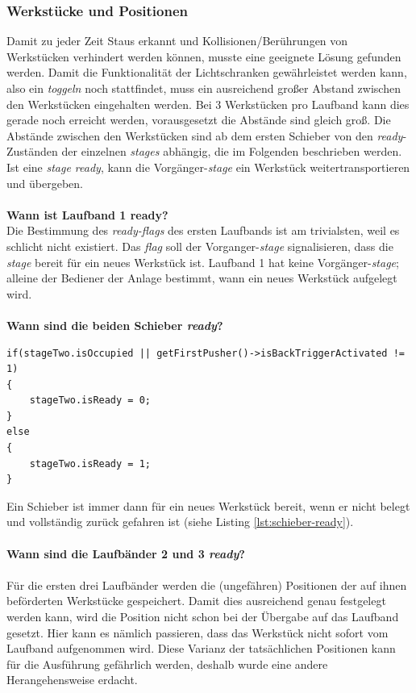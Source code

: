 \documentclass[fontsize=11pt,a4paper,final]{scrartcl}[2003/01/01]
\begin{document}
\subsubsection{Werkstücke und Positionen}
Damit zu jeder Zeit Staus erkannt und Kollisionen/Berührungen von Werkstücken verhindert werden können, musste eine geeignete Lösung gefunden werden. Damit die Funktionalität der Lichtschranken gewährleistet werden kann, also ein \textit{toggeln} noch stattfindet, muss ein ausreichend großer Abstand zwischen den Werkstücken eingehalten werden. Bei 3 Werkstücken pro Laufband kann dies gerade noch erreicht werden, vorausgesetzt die Abstände sind gleich groß. Die Abstände zwischen den Werkstücken sind ab dem ersten Schieber von den \textit{ready}-Zuständen der einzelnen \textit{stages} abhängig, die im Folgenden beschrieben werden. Ist eine \textit{stage ready}, kann die Vorgänger-\textit{stage} ein Werkstück weitertransportieren und übergeben. \\ \\
\textbf{Wann ist Laufband 1 ready?} \\
Die Bestimmung des \textit{ready-flags} des ersten Laufbands ist am trivialsten, weil es schlicht nicht existiert. Das \textit{flag} soll der Vorganger-\textit{stage} signalisieren, dass die \textit{stage} bereit für ein neues Werkstück ist. Laufband 1 hat keine Vorgänger-\textit{stage}; alleine der Bediener der Anlage bestimmt, wann ein neues Werkstück aufgelegt wird. \\ \\
\textbf{Wann sind die beiden Schieber \textit{ready}?}
\begin{lstlisting}[caption={Beispiel: \textit{ready-flag} des ersten Schiebers},label={lst:schieber-ready}]
if(stageTwo.isOccupied || getFirstPusher()->isBackTriggerActivated != 1)
{
   	stageTwo.isReady = 0;
}
else
{
   	stageTwo.isReady = 1;
}
\end{lstlisting} 
Ein Schieber ist immer dann für ein neues Werkstück bereit, wenn er nicht belegt und vollständig zurück gefahren ist (siehe Listing \ref{lst:schieber-ready}). \\ \\
\textbf{Wann sind die Laufbänder 2 und 3 \textit{ready}?} \\ \\
Für die ersten drei Laufbänder werden die (ungefähren) Positionen der auf ihnen beförderten Werkstücke gespeichert. Damit dies ausreichend genau festgelegt werden kann, wird die Position nicht schon bei der Übergabe auf das Laufband gesetzt. Hier kann es nämlich passieren, dass das Werkstück nicht sofort vom Laufband aufgenommen wird. Diese Varianz der tatsächlichen Positionen kann für die Ausführung gefährlich werden, deshalb wurde eine andere Herangehensweise erdacht.
\end{document}
